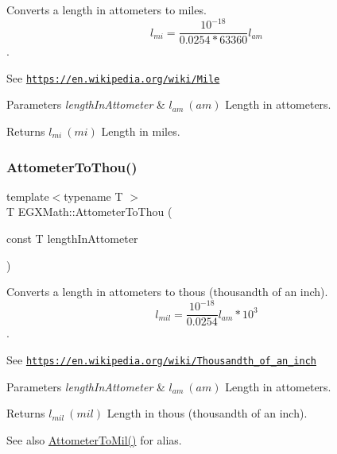 Converts a length in attometers to miles. \[ l_{mi}=\frac{10^{-18}}{0.0254 * 63360} l_{am} \]. 

See \href{https://en.wikipedia.org/wiki/Mile}{\tt https\+://en.\+wikipedia.\+org/wiki/\+Mile} 
\begin{DoxyParams}{Parameters}
{\em length\+In\+Attometer} & $ l_{am}\ (am)$ Length in attometers. \\
\hline
\end{DoxyParams}
\begin{DoxyReturn}{Returns}
$ l_{mi}\ (mi)$ Length in miles. 
\end{DoxyReturn}
\mbox{\label{group___e_g_x_math-_conversions-_length_conversions-_attometer-_imperial_gac9c9742b80b24da4e531fbcdc39976bb}} 
\subsubsection{\texorpdfstring{Attometer\+To\+Thou()}{AttometerToThou()}}
{\footnotesize\ttfamily template$<$typename T $>$ \\
T E\+G\+X\+Math\+::\+Attometer\+To\+Thou (\begin{DoxyParamCaption}\item[{const T}]{length\+In\+Attometer }\end{DoxyParamCaption})}



Converts a length in attometers to thous (thousandth of an inch). \[ l_{mil}= \frac{10^{-18}}{0.0254} l_{am} * 10^{3} \]. 

See \href{https://en.wikipedia.org/wiki/Thousandth_of_an_inch}{\tt https\+://en.\+wikipedia.\+org/wiki/\+Thousandth\+\_\+of\+\_\+an\+\_\+inch} 
\begin{DoxyParams}{Parameters}
{\em length\+In\+Attometer} & $ l_{am}\ (am)$ Length in attometers. \\
\hline
\end{DoxyParams}
\begin{DoxyReturn}{Returns}
$ l_{mil}\ (mil)$ Length in thous (thousandth of an inch). 
\end{DoxyReturn}
\begin{DoxySeeAlso}{See also}
\mbox{\hyperlink{group___e_g_x_math-_conversions-_length_conversions-_attometer-_imperial_ga1ad78989a93e5316f787a6412e2c8e3a}{Attometer\+To\+Mil()}} for alias. 
\end{DoxySeeAlso}
\mbox{\label{group___e_g_x_math-_conversions-_length_conversions-_attometer-_imperial_gaa88d881301681b0864a866ef45ad041c}} 
